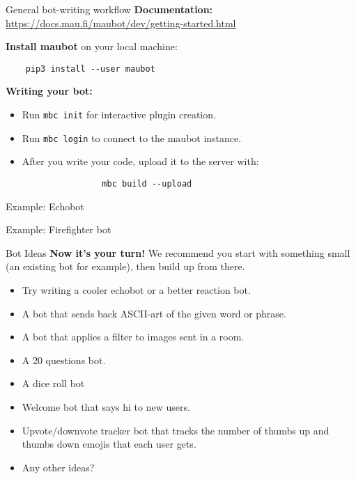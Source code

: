 \documentclass{acm}
\begin{document}
\begin{frame}[fragile]{General bot-writing workflow}
    \textbf{Documentation:}
    \url{https://docs.mau.fi/maubot/dev/getting-started.html}

    \bigskip

    \textbf{Install maubot} on your local machine:
    \begin{verbatim}
    pip3 install --user maubot
    \end{verbatim}

    \textbf{Writing your bot:}
    \begin{itemize}
        \item Run \texttt{mbc init} for interactive plugin creation.
        \item Run \texttt{mbc login} to connect to the maubot instance.
        \item After you write your code, upload it to the server with:
            \begin{verbatim}
                mbc build --upload
            \end{verbatim}
    \end{itemize}
\end{frame}

\begin{frame}[standout]
    \Huge
    Example: Echobot
\end{frame}

\begin{frame}[standout]
    \Huge
    Example: Firefighter bot
\end{frame}

\begin{frame}{Bot Ideas}
    \textbf{Now it's your turn!} We recommend you start with something small (an
    existing bot for example), then build up from there.

    \begin{itemize}
        \item Try writing a cooler echobot or a better reaction bot.
        \item A bot that sends back ASCII-art of the given word or phrase.
        \item A bot that applies a filter to images sent in a room.
        \item A 20 questions bot.
        \item A dice roll bot
        \item Welcome bot that says hi to new users.
        \item Upvote/downvote tracker bot that tracks the number of thumbs up
            and thumbs down emojis that each user gets.
        \item Any other ideas?
    \end{itemize}
\end{frame}
\end{document}
